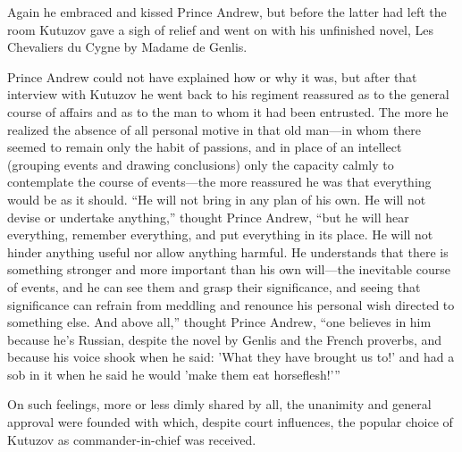 Again he embraced and kissed Prince Andrew, but before the latter
had left the room Kutuzov gave a sigh of relief and went on with
his unfinished novel, Les Chevaliers du Cygne by Madame de
Genlis.

Prince Andrew could not have explained how or why it was, but
after that interview with Kutuzov he went back to his regiment
reassured as to the general course of affairs and as to the man
to whom it had been entrusted. The more he realized the absence
of all personal motive in that old man---in whom there seemed to
remain only the habit of passions, and in place of an intellect
(grouping events and drawing conclusions) only the capacity
calmly to contemplate the course of events---the more reassured
he was that everything would be as it should. ``He will not bring
in any plan of his own. He will not devise or undertake
anything,'' thought Prince Andrew, ``but he will hear everything,
remember everything, and put everything in its place. He will not
hinder anything useful nor allow anything harmful. He understands
that there is something stronger and more important than his own
will---the inevitable course of events, and he can see them and
grasp their significance, and seeing that significance can
refrain from meddling and renounce his personal wish directed to
something else. And above all,'' thought Prince Andrew, ``one
believes in him because he's Russian, despite the novel by Genlis
and the French proverbs, and because his voice shook when he
said: 'What they have brought us to!' and had a sob in it when he
said he would 'make them eat horseflesh!'{}''

On such feelings, more or less dimly shared by all, the unanimity
and general approval were founded with which, despite court
influences, the popular choice of Kutuzov as commander-in-chief
was received.


